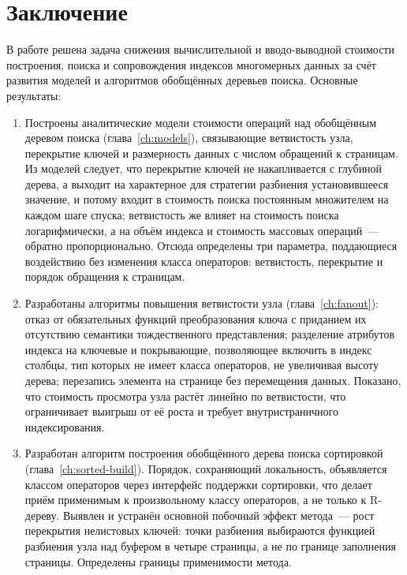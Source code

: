 \chapter*{Заключение}

В работе решена задача снижения вычислительной и вводо-выводной стоимости
построения, поиска и сопровождения индексов многомерных данных за счёт развития
моделей и алгоритмов обобщённых деревьев поиска. Основные результаты:

\begin{enumerate}

\item Построены аналитические модели стоимости операций над обобщённым деревом
поиска (глава~\ref{ch:models}), связывающие ветвистость узла, перекрытие ключей
и размерность данных с числом обращений к страницам. Из моделей следует, что
перекрытие ключей не накапливается с глубиной дерева, а выходит на характерное
для стратегии разбиения установившееся значение, и потому входит в стоимость
поиска постоянным множителем на каждом шаге спуска; ветвистость же влияет на
стоимость поиска логарифмически, а на объём индекса и стоимость массовых
операций~--- обратно пропорционально. Отсюда определены три
параметра, поддающиеся воздействию без изменения класса операторов: ветвистость,
перекрытие и порядок обращения к страницам.

\item Разработаны алгоритмы повышения ветвистости узла
(глава~\ref{ch:fanout}): отказ от обязательных функций преобразования ключа с
приданием их отсутствию семантики тождественного представления; разделение
атрибутов индекса на ключевые и покрывающие, позволяющее включить в индекс
столбцы, тип которых не имеет класса операторов, не увеличивая высоту дерева;
перезапись элемента на странице без перемещения данных. Показано, что стоимость
просмотра узла растёт линейно по ветвистости, что ограничивает выигрыш от её
роста и требует внутристраничного индексирования.

\item Разработан алгоритм построения обобщённого дерева поиска сортировкой
(глава~\ref{ch:sorted-build}). Порядок, сохраняющий локальность, объявляется
классом операторов через интерфейс поддержки сортировки, что делает приём
применимым к произвольному классу операторов, а не только к R-дереву. Выявлен и
устранён основной побочный эффект метода~--- рост перекрытия нелистовых ключей:
точки разбиения выбираются функцией разбиения узла над буфером в четыре
страницы, а не по границе заполнения страницы. Определены границы применимости
метода.


\end{enumerate}
